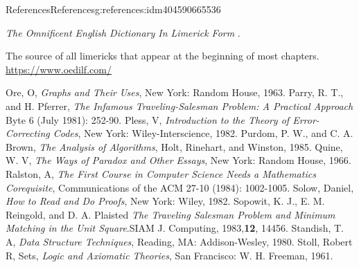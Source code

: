 \documentclass[twoside,10pt,]{book}
\numberwithin{equation}{section}
\begin{document}
\begin{references-chapter-numberless}{References}{}{References}{}{}{g:references:idm404590665536}
\begin{referencelist}
\label{x:biblio:biblio-limerick-2020}{}\hypertarget{x:biblio:biblio-limerick-2020}{}\textit{The Omnificent English Dictionary In Limerick Form} . \par%
The source of all limericks that appear at the beginning of most chapters. \href{https://www.oedilf.com/}{https:\slash{}\slash{}www.oedilf.com\slash{}}%

\label{x:biblio:biblio-ore-1963}{}\hypertarget{x:biblio:biblio-ore-1963}{}Ore, O, \textit{Graphs and Their Uses}, New York: Random House, 1963.
\label{x:biblio:biblio-parry-1981}{}\hypertarget{x:biblio:biblio-parry-1981}{}Parry, R. T., and H. Pferrer, \textit{The Infamous Traveling-Salesman Problem: A Practical Approach} Byte 6 (July 1981): 252-90.
\label{x:biblio:biblio-pless-1982}{}\hypertarget{x:biblio:biblio-pless-1982}{}Pless, V, \textit{Introduction to the Theory of Error-Correcting Codes}, New York: Wiley-Interscience, 1982.
\label{x:biblio:biblio-purdom-1985}{}\hypertarget{x:biblio:biblio-purdom-1985}{}Purdom, P. W., and C. A. Brown, \textit{The Analysis of Algorithms}, Holt, Rinehart, and Winston, 1985.
\label{x:biblio:biblio-quine-1966}{}\hypertarget{x:biblio:biblio-quine-1966}{}Quine, W. V, \textit{The Ways of Paradox and Other Essays}, New York: Random House, 1966.
\label{x:biblio:biblio-ralson-1984}{}\hypertarget{x:biblio:biblio-ralson-1984}{}Ralston, A, \textit{The First Course in Computer Science Needs a Mathematics Corequisite}, Communications of the ACM 27-10 (1984): 1002-1005.
\label{x:biblio:biblio-solow-1982}{}\hypertarget{x:biblio:biblio-solow-1982}{}Solow, Daniel, \textit{How to Read and Do Proofs}, New York: Wiley, 1982.
\label{x:biblio:biblio-sopowit-1983}{}\hypertarget{x:biblio:biblio-sopowit-1983}{}Sopowit, K. J., E. M. Reingold, and D. A. Plaisted \textit{The Traveling Salesman Problem and Minimum Matching in the Unit Square}.SIAM J. Computing, 1983,\textbf{12}, 144\textendash{}56.
\label{x:biblio:biblio-standish-1980}{}\hypertarget{x:biblio:biblio-standish-1980}{}Standish, T. A, \textit{Data Structure Techniques}, Reading, MA: Addison-Wesley, 1980.
\label{x:biblio:biblio-stoll-1961}{}\hypertarget{x:biblio:biblio-stoll-1961}{}Stoll, Robert R, Sets, \textit{Logic and Axiomatic Theories}, San Francisco: W. H. Freeman, 1961.

\end{referencelist}
\end{references-chapter-numberless}
\end{document}
